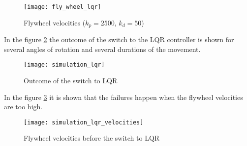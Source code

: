 \begin{figure}[h]
  \centering
  \texttt{[image: fly\_wheel\_lqr]}
  \caption{Flywheel velocities ($k_p = 2500$, $k_d = 50$)\label{fig:fw_velocites_lqr}}
\end{figure}
\par
In the figure \ref{fig:simulation_lqr} the outcome of the switch to the LQR controller
is shown for several angles of rotation and several durations of the movement.
\begin{figure}[h]
  \centering
  \texttt{[image: simulation\_lqr]}
  \caption{Outcome of the switch to LQR\label{fig:simulation_lqr}}
\end{figure}
In the figure \ref{fig:simulation_lqr_velocities} it is shown that
the failures happen when the flywheel velocities are too high.
\begin{figure}[h]
  \centering
  \texttt{[image: simulation\_lqr\_velocities]}
  \caption{Flywheel velocities before the switch to LQR\label{fig:simulation_lqr_velocities}}
\end{figure}

\newpage
